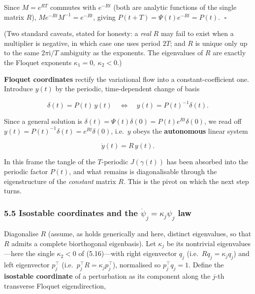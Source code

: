 \documentclass[
  11pt,
]{article}
\providecommand{\lt}{<}
\begin{document}
Since \(M=e^{RT}\) commutes with \(e^{-Rt}\) (both are analytic
functions of the single matrix \(R\)), \(M e^{-Rt}M^{-1}=e^{-Rt}\),
giving \(P(t+T)=\Psi(t)e^{-Rt}=P(t)\). \(\;\square\)

(Two standard caveats, stated for honesty: a \emph{real} \(R\) may fail
to exist when a multiplier is negative, in which case one uses period
\(2T\); and \(R\) is unique only up to the same \(2\pi\mathrm{i}/T\)
ambiguity as the exponents. The eigenvalues of \(R\) are exactly the
Floquet exponents \(\kappa_1=0,\ \kappa_2\lt 0\).)

\textbf{Floquet coordinates} rectify the variational flow into a
constant-coefficient one. Introduce \(y(t)\) by the periodic,
time-dependent change of basis

\[
\delta(t)=P(t)\,y(t)\quad\Longleftrightarrow\quad y(t)=P(t)^{-1}\delta(t).
\tag{5.19}
\]

Since a general solution is
\(\delta(t)=\Psi(t)\delta(0)=P(t)e^{Rt}\delta(0)\), we read off
\(y(t)=P(t)^{-1}\delta(t)=e^{Rt}\delta(0)\), i.e.~\(y\) obeys the
\textbf{autonomous} linear system

\[
\dot y(t)=R\,y(t).
\tag{5.20}
\]

In this frame the tangle of the \(T\)-periodic \(J(\gamma(t))\) has been
absorbed into the periodic factor \(P(t)\), and what remains is
diagonalisable through the eigenstructure of the \emph{constant} matrix
\(R\). This is the pivot on which the next step turns.

\subsubsection{\texorpdfstring{5.5 Isostable coordinates and the
\(\dot\psi_j=\kappa_j\psi_j\)
law}{5.5 Isostable coordinates and the \textbackslash dot\textbackslash psi\_j=\textbackslash kappa\_j\textbackslash psi\_j law}}\label{isostable-coordinates-and-the-dotpsi_jkappa_jpsi_j-law}

Diagonalise \(R\) (assume, as holds generically and here, distinct
eigenvalues, so that \(R\) admits a complete biorthogonal eigenbasis).
Let \(\kappa_j\) be its nontrivial eigenvalues---here the single
\(\kappa_2\lt 0\) of (5.16)---with right eigenvector \(q_j\)
(i.e.~\(Rq_j=\kappa_j q_j\)) and left eigenvector \(p_j^\top\)
(i.e.~\(p_j^\top R=\kappa_j p_j^\top\)), normalised so
\(p_j^\top q_j=1\). Define the \textbf{isostable coordinate} of a
perturbation as its component along the \(j\)-th transverse Floquet
eigendirection,
\end{document}
